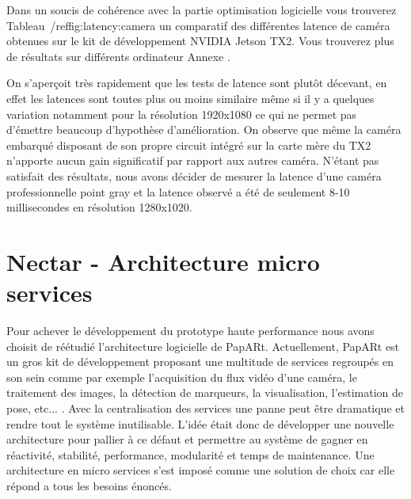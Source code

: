 Dans un soucis de cohérence avec la partie optimisation logicielle vous trouverez Tableau~/ref{fig:latency:camera} un comparatif des différentes latence de caméra obtenues sur le kit de développement NVIDIA Jetson TX2. Vous trouverez plus de résultats sur différents ordinateur Annexe %
.

\begin{table}[H]
\centering
\caption{Latence de plusieurs caméra mesuré en Glass to glass - NVIDIA Jetson TX2}
\label{fig:latency:camera}
\end{table}

On s'aperçoit très rapidement que les tests de latence sont plutôt décevant, en effet les latences sont toutes plus ou moins similaire même si il y a quelques variation notamment pour la résolution 1920x1080 ce qui ne permet pas d'émettre beaucoup d'hypothèse d'amélioration. On observe que même la caméra embarqué disposant de son propre circuit intégré sur la carte mère du TX2 n'apporte aucun gain significatif par rapport aux autres caméra.
N'étant pas satisfait des résultats, nous avons décider de mesurer la latence d'une caméra professionnelle point gray et la latence observé a été de seulement 8-10 millisecondes en résolution 1280x1020.

\newpage
\section{Nectar - Architecture micro services}
\label{sec:nectararchi}

Pour achever le développement du prototype haute performance nous avons choisit de réétudié l'architecture logicielle de PapARt. Actuellement, PapARt est un gros kit de développement proposant une multitude de services regroupés en son sein comme par exemple l'acquisition du flux vidéo d'une caméra, le traitement des images, la détection de marqueurs, la visualisation, l'estimation de pose, etc... . Avec la centralisation des services une panne peut être dramatique et rendre tout le système inutilisable.
L'idée était donc de développer une nouvelle architecture pour pallier à ce défaut et permettre au système de gagner en réactivité, stabilité, performance, modularité et temps de maintenance. Une architecture en micro services s'est imposé comme une solution de choix car elle répond a tous les besoins énoncés.

